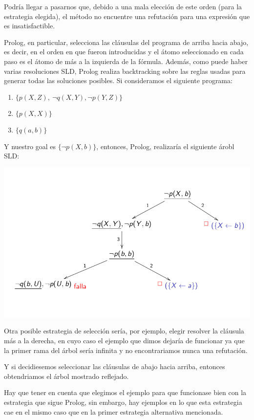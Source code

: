 Podría llegar a pasarnos que, debido a una mala elección de este orden (para la estrategia elegida), el método no encuentre una refutación para una expresión que es insatisfactible. 

Prolog, en particular, selecciona las cláusulas del programa de arriba hacia abajo, es decir, en el orden en que fueron introducidas y el átomo seleccionado en cada paso es el átomo de más a la izquierda de la fórmula. Además, como puede haber varias resoluciones SLD, Prolog realiza backtracking sobre las reglas usadas para generar todas las soluciones posibles.
Si consideramos el siguiente programa:

\begin{enumerate}
\item $\{ p(X,Z),~\lnot q(X,Y), \lnot p(Y,Z) \}$
\item $\{ p(X,X)\}$
\item $\{q(a,b)\}$
\end{enumerate}

Y nuestro goal es $\{\lnot p(X,b)\}$, entonces, Prolog, realizaría el siguiente árobl SLD:

\includegraphics[scale=0.4]{imagenes/arbol_sld_prolog.png}

Otra posible estrategia de selección sería, por ejemplo, elegir resolver la cláusula más a la derecha, en cuyo caso el ejemplo que dimos dejaría de funcionar ya que la primer rama del árbol sería infinita y no encontrariamos nunca una refutación.

Y si decidiesemos seleccionar las cláusulas de abajo hacia arriba, entonces obtendriamos el árbol mostrado reflejado.

Hay que tener en cuenta que elegimos el ejemplo para que funcionase bien con la estrategia que sigue Prolog, sin embargo, hay ejemplos en lo que esta estrategia cae en el mismo caso que en la primer estrategia alternativa mencionada.


